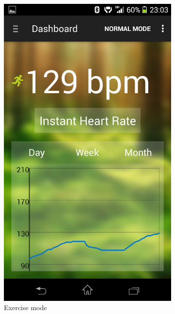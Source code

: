 \begin{figure}
\begin{subfigure}{.24\textwidth}
  \includegraphics[width=.8\linewidth]{img/screenshot/ss7.png}
  \caption{Exercise mode}
\end{subfigure}
\begin{subfigure}{.24\textwidth}
  \centering

\end{subfigure}
\end{figure}
